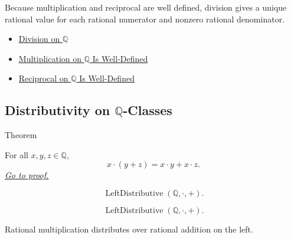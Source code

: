 \begin{remark*}[Interpretation]
Because multiplication and reciprocal are well defined, division gives a
unique rational value for each rational numerator and nonzero rational
denominator.
\end{remark*}

\begin{dependencies}
\begin{itemize}
  \item \hyperref[def:division-on-q]{Division on $\mathbb{Q}$}
  \item \hyperref[thm:multiplication-on-q-well-defined]{Multiplication on $\mathbb{Q}$ Is Well-Defined}
  \item \hyperref[thm:reciprocal-on-q-well-defined]{Reciprocal on $\mathbb{Q}$ Is Well-Defined}
\end{itemize}
\end{dependencies}

\subsection*{\texorpdfstring{Distributivity on $\mathbb{Q}$-Classes}{Distributivity on Q-Classes}}

\begin{theorembox}{Theorem}
\begin{theorem}
\label{thm:left-distributivity-on-q}
For all $x,y,z\in\mathbb{Q}$,
\[
x\cdot(y+z)=x\cdot y+x\cdot z.
\]
\hyperref[prf:left-distributivity-on-q]{\textit{Go to proof.}}
\end{theorem}
\end{theorembox}

\begin{remark*}
\[
\operatorname{LeftDistributive}(\mathbb{Q},\cdot,+).
\]
\end{remark*}

\begin{remark*}
\[
\operatorname{LeftDistributive}(\mathbb{Q},\cdot,+).
\]
\end{remark*}

\begin{remark*}[Interpretation]
Rational multiplication distributes over rational addition on the left.
\end{remark*}

